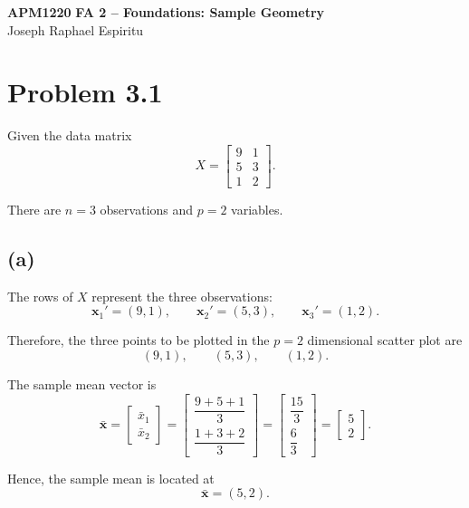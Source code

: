 \documentclass[12pt]{article}
\begin{document}
 
	
	\begin{center} 
		{\large\textbf{APM1220}} \quad 
		\textbf{FA 2 -- Foundations: Sample Geometry} \quad  
		\\ Joseph Raphael Espiritu 
	\end{center} 
	
	\vspace{-0.3em} 
	
	\section*{Problem 3.1}
	
	Given the data matrix
	\[
	X=
	\begin{bmatrix}
		9&1\\
		5&3\\
		1&2
	\end{bmatrix}.
	\]
	
	There are \(n=3\) observations and \(p=2\) variables.
	
	\subsection*{(a)}
	
	The rows of \(X\) represent the three observations:
	\[
	\mathbf{x}_1'=(9,1),\qquad
	\mathbf{x}_2'=(5,3),\qquad
	\mathbf{x}_3'=(1,2).
	\]
	
	Therefore, the three points to be plotted in the
	\(p=2\) dimensional scatter plot are
	\[
	(9,1),\qquad (5,3),\qquad (1,2).
	\]
	
	The sample mean vector is
	\[
	\bar{\mathbf{x}}
	=
	\begin{bmatrix}
		\bar{x}_1\\
		\bar{x}_2
	\end{bmatrix}
	=
	\begin{bmatrix}
		\dfrac{9+5+1}{3}\\[6pt]
		\dfrac{1+3+2}{3}
	\end{bmatrix}
	=
	\begin{bmatrix}
		\dfrac{15}{3}\\[6pt]
		\dfrac{6}{3}
	\end{bmatrix}
	=
	\boxed{
		\begin{bmatrix}
			5\\
			2
	\end{bmatrix}}.
	\]
	
	Hence, the sample mean is located at
	\[
	\boxed{\bar{\mathbf{x}}=(5,2)}.
	\]
	
\end{document}

